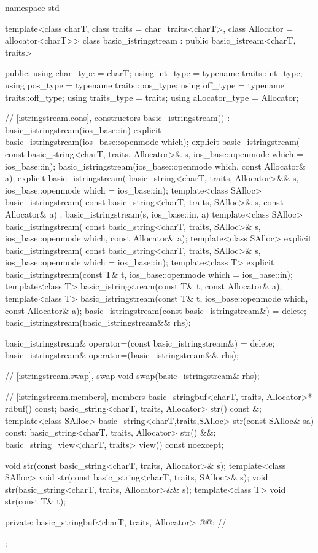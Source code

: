 %
\begin{codeblock}
namespace std {
  template<class charT, class traits = char_traits<charT>, class Allocator = allocator<charT>>
  class basic_istringstream : public basic_istream<charT, traits> {
  public:
    using char_type      = charT;
    using int_type       = typename traits::int_type;
    using pos_type       = typename traits::pos_type;
    using off_type       = typename traits::off_type;
    using traits_type    = traits;
    using allocator_type = Allocator;

    // \ref{istringstream.cons}, constructors
    basic_istringstream() : basic_istringstream(ios_base::in) {}
    explicit basic_istringstream(ios_base::openmode which);
    explicit basic_istringstream(
      const basic_string<charT, traits, Allocator>& s,
      ios_base::openmode which = ios_base::in);
    basic_istringstream(ios_base::openmode which, const Allocator& a);
    explicit basic_istringstream(
      basic_string<charT, traits, Allocator>&& s,
      ios_base::openmode which = ios_base::in);
    template<class SAlloc>
      basic_istringstream(
        const basic_string<charT, traits, SAlloc>& s, const Allocator& a)
        : basic_istringstream(s, ios_base::in, a) {}
    template<class SAlloc>
      basic_istringstream(
        const basic_string<charT, traits, SAlloc>& s,
        ios_base::openmode which, const Allocator& a);
    template<class SAlloc>
      explicit basic_istringstream(
        const basic_string<charT, traits, SAlloc>& s,
        ios_base::openmode which = ios_base::in);
    template<class T>
      explicit basic_istringstream(const T& t, ios_base::openmode which = ios_base::in);
    template<class T>
      basic_istringstream(const T& t, const Allocator& a);
    template<class T>
      basic_istringstream(const T& t, ios_base::openmode which, const Allocator& a);
    basic_istringstream(const basic_istringstream&) = delete;
    basic_istringstream(basic_istringstream&& rhs);

    basic_istringstream& operator=(const basic_istringstream&) = delete;
    basic_istringstream& operator=(basic_istringstream&& rhs);

    // \ref{istringstream.swap}, swap
    void swap(basic_istringstream& rhs);

    // \ref{istringstream.members}, members
    basic_stringbuf<charT, traits, Allocator>* rdbuf() const;
    basic_string<charT, traits, Allocator> str() const &;
    template<class SAlloc>
      basic_string<charT,traits,SAlloc> str(const SAlloc& sa) const;
    basic_string<charT, traits, Allocator> str() &&;
    basic_string_view<charT, traits> view() const noexcept;

    void str(const basic_string<charT, traits, Allocator>& s);
    template<class SAlloc>
      void str(const basic_string<charT, traits, SAlloc>& s);
    void str(basic_string<charT, traits, Allocator>&& s);
    template<class T>
      void str(const T& t);

  private:
    basic_stringbuf<charT, traits, Allocator> @@;   // \expos
  };
}
\end{codeblock}

